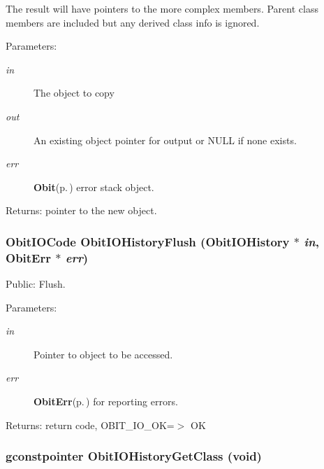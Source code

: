 The result will have pointers to the more complex members. Parent class members are included but any derived class info is ignored. \begin{Desc}
\item[Parameters:]
\begin{description}
\item[{\em in}]The object to copy \item[{\em out}]An existing object pointer for output or NULL if none exists. \item[{\em err}]{\bf Obit}{\rm (p.\,\pageref{structObit})} error stack object. \end{description}
\end{Desc}
\begin{Desc}
\item[Returns:]pointer to the new object. \end{Desc}
\subsubsection{\setlength{\rightskip}{0pt plus 5cm}Obit\-IOCode Obit\-IOHistory\-Flush ({\bf Obit\-IOHistory} $\ast$ {\em in}, {\bf Obit\-Err} $\ast$ {\em err})}\label{ObitIOHistory_8c_a19}


Public: Flush. 

\begin{Desc}
\item[Parameters:]
\begin{description}
\item[{\em in}]Pointer to object to be accessed. \item[{\em err}]{\bf Obit\-Err}{\rm (p.\,\pageref{structObitErr})} for reporting errors. \end{description}
\end{Desc}
\begin{Desc}
\item[Returns:]return code, OBIT\_\-IO\_\-OK=$>$ OK \end{Desc}
\subsubsection{\setlength{\rightskip}{0pt plus 5cm}gconstpointer Obit\-IOHistory\-Get\-Class (void)}\label{ObitIOHistory_8c_a7}


